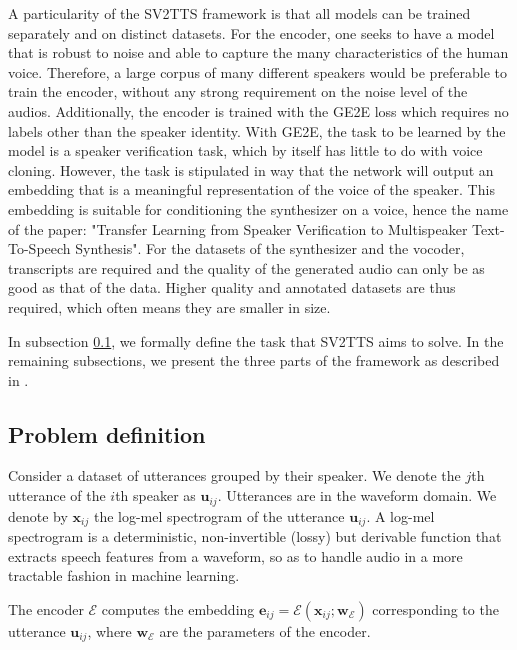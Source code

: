 \documentclass[a4paper, oneside, 12pt, english]{article}
\begin{document}
A particularity of the SV2TTS framework is that all models can be trained separately and on distinct datasets. For the encoder, one seeks to have a model that is robust to noise and able to capture the many characteristics of the human voice. Therefore, a large corpus of many different speakers would be preferable to train the encoder, without any strong requirement on the noise level of the audios. Additionally, the encoder is trained with the GE2E loss which requires no labels other than the speaker identity. With GE2E, the task to be learned by the model is a speaker verification task, which by itself has little to do with voice cloning. However, the task is stipulated in way that the network will output an embedding that is a meaningful representation of the voice of the speaker. This embedding is suitable for conditioning the synthesizer on a voice, hence the name of the paper: "Transfer Learning from Speaker Verification to Multispeaker Text-To-Speech Synthesis". For the datasets of the synthesizer and the vocoder, transcripts are required and the quality of the generated audio can only be as good as that of the data. Higher quality and annotated datasets are thus required, which often means they are smaller in size.

In subsection \ref{problem_definition}, we formally define the task that SV2TTS aims to solve. In the remaining subsections, we present the three parts of the framework as described in \citep{SV2TTS}.


\subsection{Problem definition} \label{problem_definition}
\newcommand{\vx}{\mathbf{x}}
\newcommand{\vu}{\mathbf{u}}
\newcommand{\ve}{\mathbf{e}}
\newcommand{\vt}{\mathbf{t}}
\newcommand{\vc}{\mathbf{c}}
\newcommand{\vw}{\mathbf{w}}
\newcommand{\ms}{\mathbf{S}}
\newcommand{\enc}{\mathcal{E}}
\newcommand{\syn}{\mathcal{S}}
\newcommand{\voc}{\mathcal{V}}
Consider a dataset of utterances grouped by their speaker. We denote the $j$th utterance of the $i$th speaker as $\vu_{ij}$. Utterances are in the waveform domain. We denote by $\vx_{ij}$ the log-mel spectrogram of the utterance $\vu_{ij}$. A log-mel spectrogram is a deterministic, non-invertible (lossy) but derivable function that extracts speech features from a waveform, so as to handle audio in a more tractable fashion in machine learning.

The encoder $\enc$ computes the embedding $\ve_{ij} = \enc(\vx_{ij}; \vw_\enc)$ corresponding to the utterance $\vu_{ij}$, where $\vw_\enc$ are the parameters of the encoder. %
\end{document}
